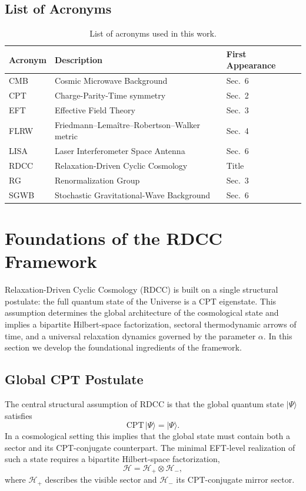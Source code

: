 \documentclass[11pt,a4paper]{article}
\begin{document}
\subsection*{List of Acronyms}

\begin{longtable}{lll}
\caption{List of acronyms used in this work.}\\
\textbf{Acronym} & \textbf{Description} & \textbf{First Appearance} \\
\hline
CMB & Cosmic Microwave Background & Sec.~6 \\
CPT & Charge-Parity-Time symmetry & Sec.~2 \\
EFT & Effective Field Theory & Sec.~3 \\
FLRW & Friedmann–Lemaître–Robertson–Walker metric & Sec.~4 \\
LISA & Laser Interferometer Space Antenna & Sec.~6 \\
RDCC & Relaxation-Driven Cyclic Cosmology & Title \\
RG & Renormalization Group & Sec.~3 \\
SGWB & Stochastic Gravitational-Wave Background & Sec.~6 \\
\end{longtable}


\section{Foundations of the RDCC Framework}

Relaxation-Driven Cyclic Cosmology (RDCC) is built on a single structural
postulate: the full quantum state of the Universe is a CPT eigenstate. This
assumption determines the global architecture of the cosmological state and
implies a bipartite Hilbert-space factorization, sectoral thermodynamic arrows
of time, and a universal relaxation dynamics governed by the parameter
\(\alpha\). In this section we develop the foundational ingredients of the
framework.


\subsection{Global CPT Postulate}

The central structural assumption of RDCC is that the global quantum state
\(|\Psi\rangle\) satisfies
\begin{equation}
    \mathrm{CPT}\,|\Psi\rangle = |\Psi\rangle.
\end{equation}
In a cosmological setting this implies that the global state must contain both a
sector and its CPT-conjugate counterpart. The minimal EFT-level realization of
such a state requires a bipartite Hilbert-space factorization,
\begin{equation}
    \mathcal{H} = \mathcal{H}_{+} \otimes \mathcal{H}_{-},
\end{equation}
where \(\mathcal{H}_{+}\) describes the visible sector and \(\mathcal{H}_{-}\) its
CPT-conjugate mirror sector.
\end{document}
